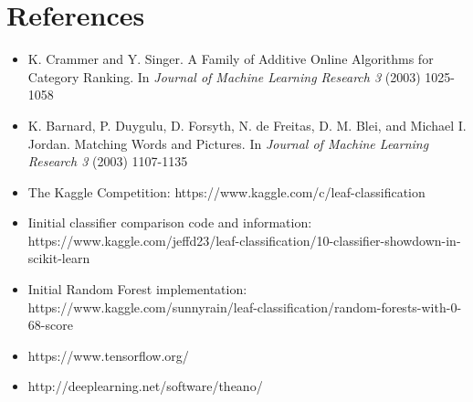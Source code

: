 \documentclass[12pt]{article}
\begin{document}
\section{References}
\begin{itemize}
	\item K. Crammer and Y. Singer. A Family of Additive Online Algorithms for Category Ranking. In \textit{Journal of Machine Learning Research 3} (2003) 1025-1058
	\item K. Barnard, P. Duygulu, D. Forsyth, N. de Freitas, D. M. Blei, and Michael I. Jordan. Matching Words and Pictures. In \textit{Journal of Machine Learning Research 3} (2003) 1107-1135
	\item The Kaggle Competition: https://www.kaggle.com/c/leaf-classification
	\item Iinitial classifier comparison code and information: https://www.kaggle.com/jeffd23/leaf-classification/10-classifier-showdown-in-scikit-learn
	\item Initial Random Forest implementation: https://www.kaggle.com/sunnyrain/leaf-classification/random-forests-with-0-68-score
	\item https://www.tensorflow.org/
	\item http://deeplearning.net/software/theano/
\end{itemize}
\end{document}
